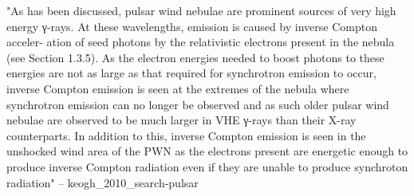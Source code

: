 "As has been discussed, pulsar wind nebulae are prominent sources of
very high energy γ-rays. At these wavelengths, emission is caused
by inverse Compton acceler- ation of seed photons by the relativistic
electrons present in the nebula (see Section 1.3.5). As the electron
energies needed to boost photons to these energies are not as large as
that required for synchrotron emission to occur, inverse Compton emission
is seen at the extremes of the nebula where synchrotron emission can no
longer be observed and as such older pulsar wind nebulae are observed to
be much larger in VHE γ-rays than their X-ray counterparts. In addition
to this, inverse Compton emission is seen in the unshocked wind area of
the PWN as the electrons present are energetic enough to produce inverse
Compton radiation even if they are unable to produce synchroton radiation" -- keogh\_2010\_search-pulsar

